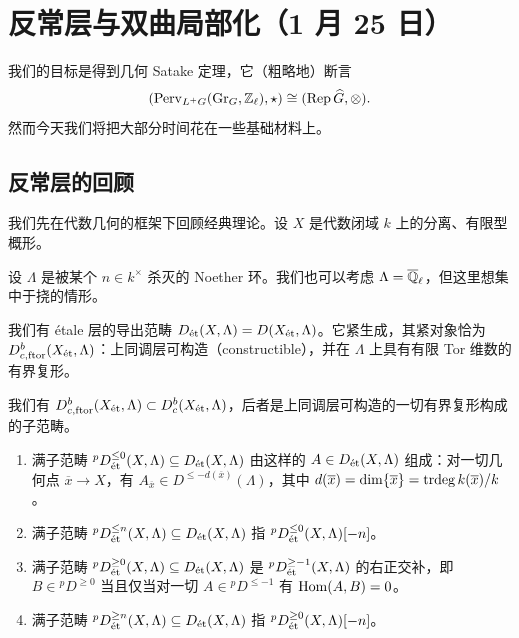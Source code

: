 \section[反常层与双曲局部化]{反常层与双曲局部化（1 月 25 日）}


我们的目标是得到几何 Satake 定理，它（粗略地）断言
\[
(\Perv_{L^+G}(\Gr_G,\Zl),\star)\cong(\Rep\widehat G,\otimes).
\]
然而今天我们将把大部分时间花在一些基础材料上。

\subsection{反常层的回顾}

我们先在代数几何的框架下回顾经典理论。设 $X$ 是代数闭域 $k$ 上的分离、有限型概形。

设 $\Lambda$ 是被某个 $n\in k^\times$ 杀灭的 Noether 环。我们也可以考虑 $\Lambda=\Ql$，但这里想集中于挠的情形。

我们有 étale 层的导出范畴 $D_\et(X,\Lambda)=D(X_\et,\Lambda)$。它紧生成，其紧对象恰为
$D^b_{c,\mathrm{ftor}}(X_\et,\Lambda)$：上同调层可构造（constructible），并在 $\Lambda$ 上具有有限 Tor 维数的有界复形。

\begin{remark}
我们有 $D^b_{c,\mathrm{ftor}}(X_\et,\Lambda)\subset D^b_c(X_\et,\Lambda)$，后者是上同调层可构造的一切有界复形构成的子范畴。
\end{remark}

\begin{definition}
\begin{enumerate}[label=(\arabic*)]
\item 满子范畴 ${}^pD^{\le0}_\et(X,\Lambda)\subseteq D_\et(X,\Lambda)$ 由这样的 $A\in D_\et(X,\Lambda)$ 组成：对一切几何点 $\overline{x}\to X$，有 $A_{\overline{x}}\in D^{\le -d(\overline{x})}(\Lambda)$，其中 $d(\overline{x})=\dim\{\overline{x}\}=\trdeg k(\overline{x})/k$。
\item 满子范畴 ${}^pD^{\le n}_\et(X,\Lambda)\subseteq D_\et(X,\Lambda)$ 指 ${}^pD^{\le0}_\et(X,\Lambda)[-n]$。
\item 满子范畴 ${}^pD^{\ge0}_\et(X,\Lambda)\subseteq D_\et(X,\Lambda)$ 是 ${}^pD^{\ge-1}_\et(X,\Lambda)$ 的右正交补，即 $B\in{}^pD^{\ge0}$ 当且仅当对一切 $A\in{}^pD^{\le-1}$ 有 $\Hom(A,B)=0$。
\item 满子范畴 ${}^pD^{\ge n}_\et(X,\Lambda)\subseteq D_\et(X,\Lambda)$ 指 ${}^pD^{\ge0}_\et(X,\Lambda)[-n]$。
\end{enumerate}
\end{definition}

